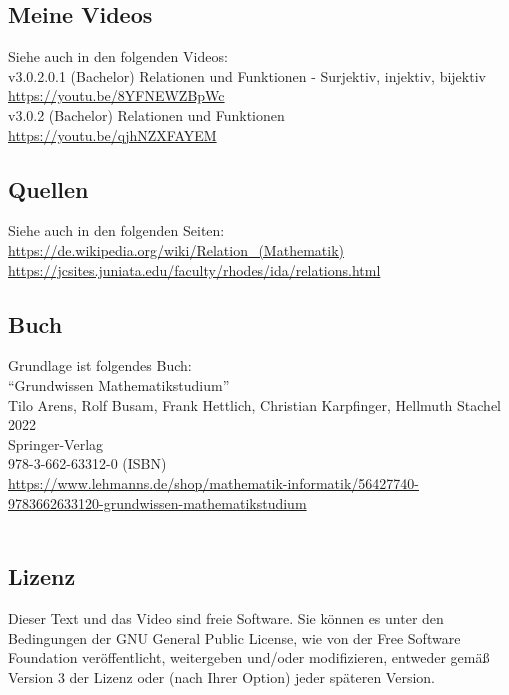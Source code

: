 \documentclass[a4paper]{amsart}
\theoremstyle{definition}
\begin{document}
\subsection*{Meine Videos}
Siehe auch in den folgenden Videos:\\
v3.0.2.0.1 (Bachelor) Relationen und Funktionen - Surjektiv, injektiv, bijektiv\\
\url{https://youtu.be/8YFNEWZBpWc}\\
v3.0.2 (Bachelor) Relationen und Funktionen\\
\url{https://youtu.be/qjhNZXFAYEM}

\subsection*{Quellen}
Siehe auch in den folgenden Seiten:\\
\url{https://de.wikipedia.org/wiki/Relation_(Mathematik)}\\
\url{https://jcsites.juniata.edu/faculty/rhodes/ida/relations.html}

\subsection*{Buch}
Grundlage ist folgendes Buch:\\
"`Grundwissen Mathematikstudium"'\\
Tilo Arens, Rolf Busam, Frank Hettlich, Christian Karpfinger, Hellmuth Stachel \\
2022\\
Springer-Verlag\\
978-3-662-63312-0 (ISBN)\\
{\tiny
   \url{https://www.lehmanns.de/shop/mathematik-informatik/56427740-9783662633120-grundwissen-mathematikstudium}}\\
\\

\subsection*{Lizenz}
Dieser Text und das Video sind freie Software. Sie können es unter den Bedingungen der 
GNU General Public License, wie von der Free Software Foundation veröffentlicht, weitergeben 
und/oder modifizieren, entweder gemäß Version 3 der Lizenz oder (nach Ihrer Option) jeder späteren Version.
\end{document}
